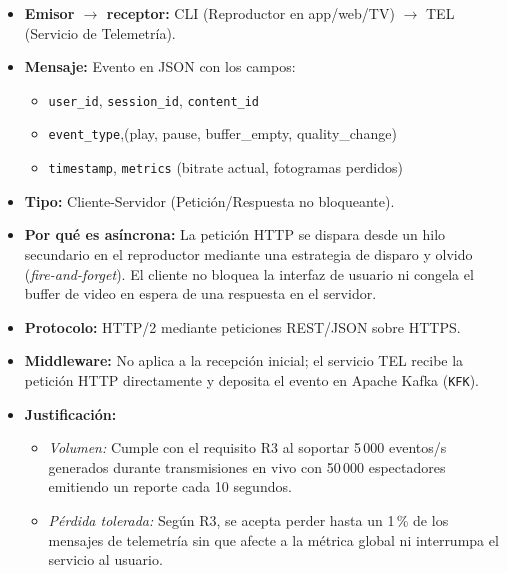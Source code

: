 \begin{itemize}
    \item \textbf{Emisor $\rightarrow$ receptor:} 
    CLI (Reproductor en app/web/TV) $\rightarrow$ TEL (Servicio de Telemetría).

    \item \textbf{Mensaje:}
    Evento en JSON con los campos:
    \begin{itemize}
        \item \texttt{user\_id}, \texttt{session\_id}, \texttt{content\_id}
        \item \texttt{event\_type},(play, pause, buffer\_empty, quality\_change)
        \item \texttt{timestamp}, \texttt{metrics} (bitrate actual, fotogramas perdidos)

    \end{itemize}

    \item \textbf{Tipo:}
    Cliente-Servidor (Petición/Respuesta no bloqueante).

    \item \textbf{Por qué es asíncrona:}
    La petición HTTP se dispara desde un hilo secundario en el reproductor mediante una estrategia de disparo y olvido (\textit{fire-and-forget}). El cliente no bloquea la interfaz de usuario
    ni congela el buffer de video en espera de una respuesta en el servidor.

    \item \textbf{Protocolo:}
    HTTP/2 mediante peticiones REST/JSON sobre HTTPS.

    \item \textbf{Middleware:}
    No aplica a la recepción inicial; el servicio TEL recibe la petición HTTP directamente y deposita el evento en Apache Kafka (\texttt{KFK}).

    \item \textbf{Justificación:}
    \begin{itemize}
        \item \textit{Volumen:}
        Cumple con el requisito R3 al soportar 5\,000 eventos/s generados durante transmisiones en vivo con 50\,000 espectadores emitiendo un reporte cada 10 segundos.

        \item \textit{Pérdida tolerada:}
        Según R3, se acepta perder hasta un 1\,\% de los mensajes de telemetría sin que afecte a la métrica global ni interrumpa el servicio al usuario.


\end{itemize}
\end{itemize}
